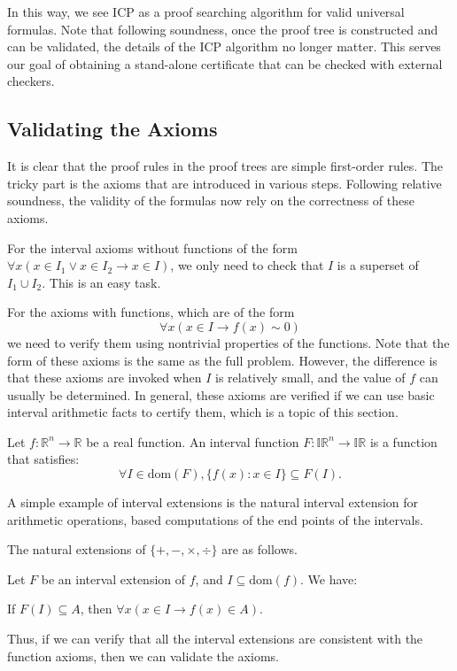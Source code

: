 \documentclass[envcountsect]{llncs}
\newcommand{\dom}{\mathrm{dom}}
\begin{document}
In this way, we see ICP as a proof searching algorithm for valid universal
formulas. Note that following soundness, once the proof tree is constructed and
can be validated, the details of the ICP algorithm no longer matter. This serves
our goal of obtaining a stand-alone certificate that can be checked with
external checkers.

\subsection{Validating the Axioms}


It is clear that the proof rules in the proof trees are simple first-order
rules. The tricky part is the axioms that are introduced in various
steps. Following relative soundness, the validity of the formulas now rely on the
correctness of these axioms.

For the interval axioms without functions of the form $\forall x(x\in I_1\vee
x\in I_2\rightarrow x\in I)$, we only need to check that $I$ is a superset of
$I_1\cup I_2$. This is an easy task.

For the axioms with functions, which are of the form
$$\forall x (x\in I \rightarrow f(x)\sim 0)$$
we need to verify them using nontrivial properties of the functions. Note that
the form of these axioms is the same as the full problem. However, the
difference is that these axioms are invoked when $I$ is relatively small, and
the value of $f$ can usually be determined. In general, these axioms are
verified if we can use basic interval arithmetic facts to certify them, which is
a topic of this section.

\begin{definition}
Let $f: \mathbb{R}^n\rightarrow \mathbb{R}$ be a real function. An interval
function $F: \mathbb{IR}^n \rightarrow \mathbb{IR}$ is a function that
satisfies:
$$\forall I\in \dom(F), \{f(x): x\in I\}\subseteq F(I).$$
\end{definition}

A simple example of interval extensions is the natural interval extension for
arithmetic operations, based computations of the end points of the intervals.
\begin{example}
The natural extensions of $\{+, -, \times, \div\}$ are as follows.
\end{example}

\begin{proposition}
Let $F$ be an interval extension of $f$, and $I\subseteq \dom(f)$. We have:
\begin{center}
If $F(I)\subseteq A$, then $\forall x (x\in I \rightarrow f(x)\in A)$.
\end{center}
\end{proposition}
Thus, if we can verify that all the interval extensions are consistent with the
function axioms, then we can validate the axioms.
\end{document}
